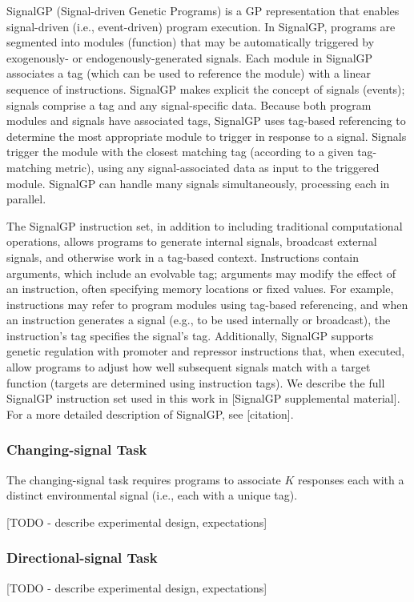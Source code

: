 SignalGP (Signal-driven Genetic Programs) is a GP representation that enables signal-driven (i.e., event-driven)
program execution.
In SignalGP, programs are segmented into modules (function) that may be automatically triggered by
exogenously- or endogenously-generated signals.
Each module in SignalGP associates a tag (which can be used to reference the module) with a linear
sequence of instructions.
SignalGP makes explicit the concept of signals (events); signals comprise a tag and any signal-specific
data.
Because both program modules and signals have associated tags, SignalGP uses tag-based referencing to
determine the most appropriate module to trigger in response to a signal.
Signals trigger the module with the closest matching tag (according to a given tag-matching metric),
using any signal-associated data as input to the triggered module.
SignalGP can handle many signals simultaneously, processing each in parallel.

The SignalGP instruction set, in addition to including traditional computational operations, allows
programs to generate internal signals, broadcast external signals, and otherwise work in a tag-based context.
Instructions contain arguments, which include an evolvable tag; arguments may modify the effect of an
instruction, often specifying memory locations or fixed values.
For example, instructions may refer to program modules using tag-based referencing, and when an instruction
generates a signal (e.g., to be used internally or broadcast), the instruction's tag specifies the signal's
tag.
Additionally, SignalGP supports genetic regulation with promoter and repressor instructions
that, when executed, allow programs to adjust how well subsequent signals match with a target function
(targets are determined using instruction tags).
We describe the full SignalGP instruction set used in this work in [SignalGP supplemental material].
For a more detailed description of SignalGP, see [citation].

\subsubsection{Changing-signal Task}

The changing-signal task requires programs to associate $K$ responses each with a distinct environmental
signal (i.e., each with a unique tag).


[TODO - describe experimental design, expectations]


\subsubsection{Directional-signal Task}



[TODO - describe experimental design, expectations]